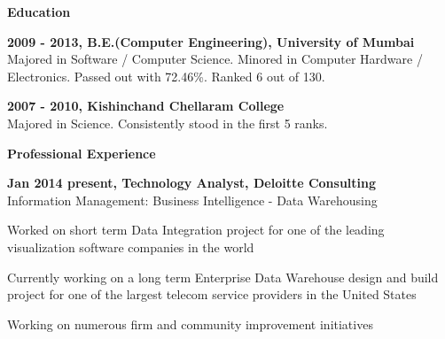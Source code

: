 \documentclass[a4paper,12pt,final]{memoir}
\newcommand{\Sep}{\vspace{1.5em}}
\newcommand{\SmallSep}{\vspace{0.5em}}
\newcommand{\CVSection}[1]
	{\Large\textbf{#1}\par
	\SmallSep\normalsize\normalfont}
\newcommand{\CVItem}[1]
	{\textbf{\color{Plum} #1}}
\begin{document}
\CVSection{Education}
\CVItem{2009 - 2013, B.E.(Computer Engineering), University of \allowbreak  Mumbai}\\
\footnotesize Majored in Software / Computer Science. Minored in Computer Hardware / Electronics. Passed out with 72.46\%. Ranked 6 out of 130.
\SmallSep

\CVItem{2007 - 2010, Kishinchand Chellaram College}\\
Majored in Science. Consistently stood in the first 5 ranks.
\SmallSep

\CVSection{Professional Experience}
\CVItem{Jan 2014 \textendash \space present, Technology Analyst, Deloitte Consulting}\\
\SmallSep
Information Management: Business Intelligence - Data Warehousing\\
\begin{minipage}{13cm}
\begin{compactitem}[\color{Plum}$\circ$]
	{\footnotesize
	\item Worked on short term Data Integration project for one of the leading visualization software companies in the world
	\item Currently working on a long term Enterprise Data Warehouse design and build project for one of the largest telecom service providers in the United States
	\item Working on numerous firm and community improvement initiatives}
\end{compactitem}
\end{minipage}
\Sep
\end{document}
